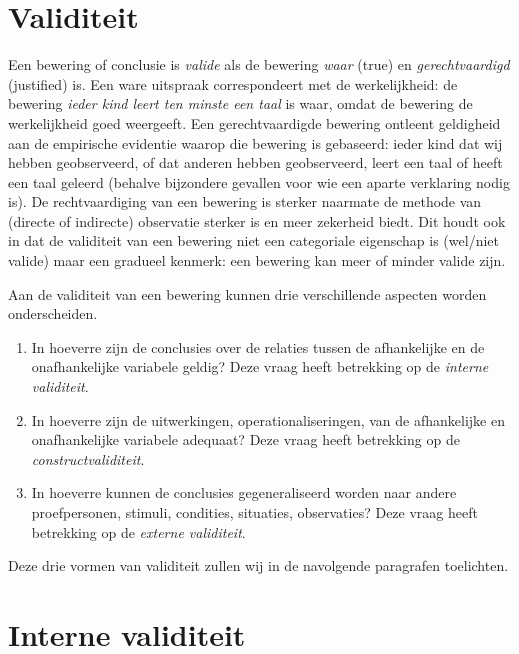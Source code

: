 \documentclass[
]{book}
\begin{document}
\hypertarget{sec:validiteit}{%
\section{Validiteit}\label{sec:validiteit}}

Een bewering of conclusie is \emph{valide} als de bewering \emph{waar} (true) en
\emph{gerechtvaardigd} (justified) is. Een ware uitspraak correspondeert met
de werkelijkheid: de bewering \emph{ieder kind leert ten minste een taal} is
waar, omdat de bewering de werkelijkheid goed weergeeft. Een
gerechtvaardigde bewering ontleent geldigheid aan de empirische
evidentie waarop die bewering is gebaseerd: ieder kind dat wij hebben
geobserveerd, of dat anderen hebben geobserveerd, leert een taal of
heeft een taal geleerd (behalve bijzondere gevallen voor wie een aparte
verklaring nodig is). De rechtvaardiging van een bewering is sterker
naarmate de methode van (directe of indirecte) observatie sterker is en
meer zekerheid biedt. Dit houdt ook in dat de validiteit van een
bewering niet een categoriale eigenschap is (wel/niet valide) maar een
gradueel kenmerk: een bewering kan meer of minder valide zijn.

Aan de validiteit van een bewering kunnen drie verschillende aspecten
worden onderscheiden.

\begin{enumerate}
\def\labelenumi{\arabic{enumi}.}
\item
  In hoeverre zijn de conclusies over de relaties tussen de
  afhankelijke en de onafhankelijke variabele geldig? Deze vraag heeft
  betrekking op de \emph{interne validiteit}.
\item
  In hoeverre zijn de uitwerkingen, operationaliseringen, van de
  afhankelijke en onafhankelijke variabele adequaat? Deze vraag heeft
  betrekking op de \emph{constructvaliditeit}.
\item
  In hoeverre kunnen de conclusies gegeneraliseerd worden naar andere
  proefpersonen, stimuli, condities, situaties, observaties? Deze
  vraag heeft betrekking op de \emph{externe validiteit}.
\end{enumerate}

Deze drie vormen van validiteit zullen wij in de navolgende paragrafen
toelichten.

\hypertarget{sec:internevaliditeit}{%
\section{Interne validiteit}\label{sec:internevaliditeit}}
\end{document}
